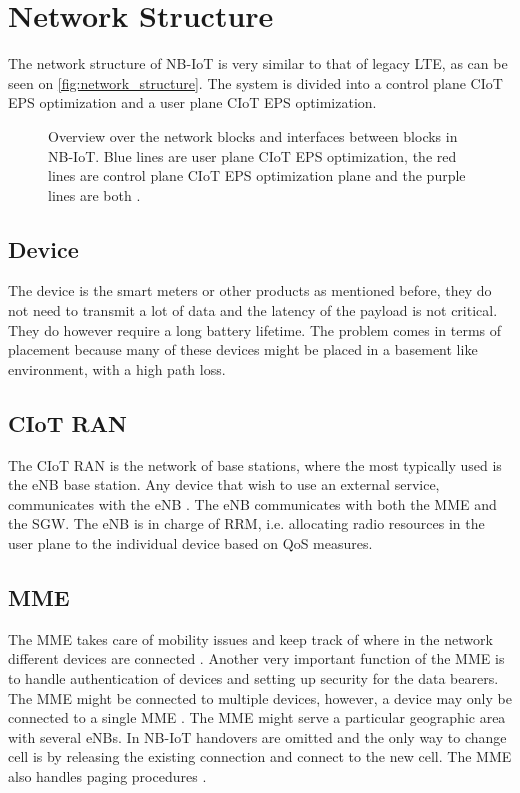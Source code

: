  \section{Network Structure}

The network structure of \gls{NB-IoT} is very similar to that of legacy \gls{LTE}, as can be seen on \autoref{fig:network_structure}. The system is divided into a control plane \gls{CIoT} \gls{EPS} optimization and a user plane \gls{CIoT} \gls{EPS} optimization.

\begin{figure}[H]
\centering

\caption{Overview over the network blocks and interfaces between blocks in \gls{NB-IoT}. Blue lines are user plane \gls{CIoT} \gls{EPS} optimization, the red lines are control plane \gls{CIoT} \gls{EPS} optimization plane and the purple lines are both \citep{NB_slide}.}
\label{fig:network_structure}
\end{figure}


\subsection{Device}
The device is the smart meters or other products as mentioned before, they do not need to transmit a lot of data and the latency of the payload is not critical. They do however require a long battery lifetime. The problem comes in terms of placement because many of these devices might be placed in a basement like environment, with a high path loss. \citep{REL-13,book_LTE_for_UMTS}

\subsection{\gls{CIoT} \gls{RAN}}
The \gls{CIoT} \gls{RAN} is the network of base stations, where the most typically used is the \gls{eNB} base station. Any device that wish to use an external service, communicates with the \gls{eNB} \citep{book_LTE_for_UMTS}. The \gls{eNB} communicates with both the \gls{MME} and the \gls{SGW}. The \gls{eNB} is in charge of \gls{RRM}, i.e. allocating radio resources in the user plane to the individual device based on \gls{QoS} measures. 

\subsection{\gls{MME}}
The \gls{MME} takes care of mobility issues and keep track of where in the network different devices are connected . Another very important function of the \gls{MME} is to handle authentication of devices and setting up security for the data bearers. The \gls{MME} might be connected to multiple devices, however, a device may only be connected to a single \gls{MME} \citep[ch. 3]{book_LTE_for_UMTS}. The \gls{MME} might serve a particular geographic area with several \gls{eNB}s. In \gls{NB-IoT} handovers are omitted and the only way to change cell is by releasing the existing connection and connect to the new cell\citep{REL-13}. The \gls{MME} also handles paging procedures \citep{NB-IoT_Book}.

